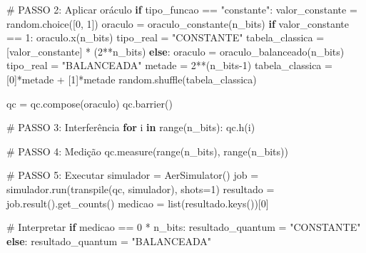 \documentclass[
  brazilian,
]{report}
\newenvironment{Shaded}{\begin{snugshade}}{\end{snugshade}}
\newcommand{\BuiltInTok}[1]{\textcolor[rgb]{0.00,0.23,0.31}{#1}}
\newcommand{\CommentTok}[1]{\textcolor[rgb]{0.37,0.37,0.37}{#1}}
\newcommand{\ControlFlowTok}[1]{\textcolor[rgb]{0.00,0.23,0.31}{\textbf{#1}}}
\newcommand{\DecValTok}[1]{\textcolor[rgb]{0.68,0.00,0.00}{#1}}
\newcommand{\KeywordTok}[1]{\textcolor[rgb]{0.00,0.23,0.31}{\textbf{#1}}}
\newcommand{\NormalTok}[1]{\textcolor[rgb]{0.00,0.23,0.31}{#1}}
\newcommand{\OperatorTok}[1]{\textcolor[rgb]{0.37,0.37,0.37}{#1}}
\newcommand{\StringTok}[1]{\textcolor[rgb]{0.13,0.47,0.30}{#1}}
\begin{document}
\begin{tcolorbox}
\begin{Shaded}
\begin{Highlighting}[]
    \CommentTok{\# PASSO 2: Aplicar oráculo}
    \ControlFlowTok{if}\NormalTok{ tipo\_funcao }\OperatorTok{==} \StringTok{"constante"}\NormalTok{:}
\NormalTok{        valor\_constante }\OperatorTok{=}\NormalTok{ random.choice([}\DecValTok{0}\NormalTok{, }\DecValTok{1}\NormalTok{])}
\NormalTok{        oraculo }\OperatorTok{=}\NormalTok{ oraculo\_constante(n\_bits)}
        \ControlFlowTok{if}\NormalTok{ valor\_constante }\OperatorTok{==} \DecValTok{1}\NormalTok{:}
\NormalTok{            oraculo.x(n\_bits)}
\NormalTok{        tipo\_real }\OperatorTok{=} \StringTok{"CONSTANTE"}
\NormalTok{        tabela\_classica }\OperatorTok{=}\NormalTok{ [valor\_constante] }\OperatorTok{*}\NormalTok{ (}\DecValTok{2}\OperatorTok{**}\NormalTok{n\_bits)}
    \ControlFlowTok{else}\NormalTok{:}
\NormalTok{        oraculo }\OperatorTok{=}\NormalTok{ oraculo\_balanceado(n\_bits)}
\NormalTok{        tipo\_real }\OperatorTok{=} \StringTok{"BALANCEADA"}
\NormalTok{        metade }\OperatorTok{=} \DecValTok{2}\OperatorTok{**}\NormalTok{(n\_bits}\OperatorTok{{-}}\DecValTok{1}\NormalTok{)}
\NormalTok{        tabela\_classica }\OperatorTok{=}\NormalTok{ [}\DecValTok{0}\NormalTok{]}\OperatorTok{*}\NormalTok{metade }\OperatorTok{+}\NormalTok{ [}\DecValTok{1}\NormalTok{]}\OperatorTok{*}\NormalTok{metade}
\NormalTok{        random.shuffle(tabela\_classica)}
    
\NormalTok{    qc }\OperatorTok{=}\NormalTok{ qc.compose(oraculo)}
\NormalTok{    qc.barrier()}
    
    \CommentTok{\# PASSO 3: Interferência}
    \ControlFlowTok{for}\NormalTok{ i }\KeywordTok{in} \BuiltInTok{range}\NormalTok{(n\_bits):}
\NormalTok{        qc.h(i)}
    
    \CommentTok{\# PASSO 4: Medição}
\NormalTok{    qc.measure(}\BuiltInTok{range}\NormalTok{(n\_bits), }\BuiltInTok{range}\NormalTok{(n\_bits))}
    
    \CommentTok{\# PASSO 5: Executar}
\NormalTok{    simulador }\OperatorTok{=}\NormalTok{ AerSimulator()}
\NormalTok{    job }\OperatorTok{=}\NormalTok{ simulador.run(transpile(qc, simulador), shots}\OperatorTok{=}\DecValTok{1}\NormalTok{)}
\NormalTok{    resultado }\OperatorTok{=}\NormalTok{ job.result().get\_counts()}
\NormalTok{    medicao }\OperatorTok{=} \BuiltInTok{list}\NormalTok{(resultado.keys())[}\DecValTok{0}\NormalTok{]}
    
    \CommentTok{\# Interpretar}
    \ControlFlowTok{if}\NormalTok{ medicao }\OperatorTok{==} \StringTok{\textquotesingle{}0\textquotesingle{}} \OperatorTok{*}\NormalTok{ n\_bits:}
\NormalTok{        resultado\_quantum }\OperatorTok{=} \StringTok{"CONSTANTE"}
    \ControlFlowTok{else}\NormalTok{:}
\NormalTok{        resultado\_quantum }\OperatorTok{=} \StringTok{"BALANCEADA"}
    

\end{Highlighting}
\end{Shaded}
\end{tcolorbox}
\end{document}
